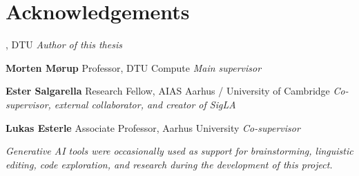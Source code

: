 \chapter{Acknowledgements}

\noindent\textbf{\thesisauthor} \newline
\authorstudy, DTU \newline
\textit{Author of this thesis} \newline

\noindent\textbf{Morten Mørup} \newline
Professor, DTU Compute \newline
\textit{Main supervisor} \newline

\noindent\textbf{Ester Salgarella} \newline
Research Fellow, AIAS Aarhus / University of Cambridge \newline
\textit{Co-supervisor, external collaborator, and creator of SigLA} \newline


\noindent\textbf{Lukas Esterle} \newline
Associate Professor, Aarhus University \newline
\textit{Co-supervisor} \newline

\noindent\textit{Generative AI tools were occasionally used as support for brainstorming, linguistic editing, code exploration, and research during the development of this project.}
